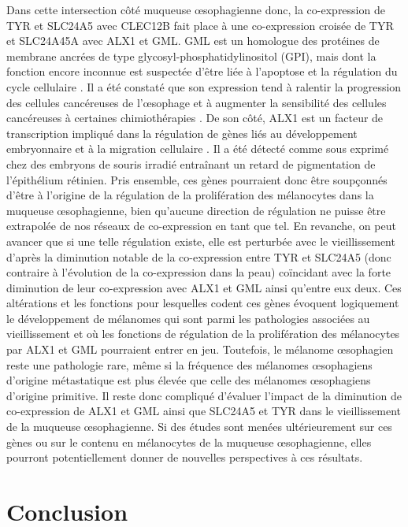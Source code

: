 Dans cette intersection côté muqueuse œsophagienne donc, la co-expression de TYR et SLC24A5 avec CLEC12B fait place à une co-expression croisée de TYR et SLC24A45A avec ALX1 et GML. 
GML est un homologue des protéines de membrane ancrées de type glycosyl-phosphatidylinositol (GPI), mais dont la fonction encore inconnue est suspectée d'être liée à l'apoptose et la régulation du cycle cellulaire . Il a été constaté que son expression tend à ralentir la progression des cellules cancéreuses de l'œsophage et à augmenter la sensibilité des cellules cancéreuses à certaines chimiothérapies . 
De son côté, ALX1 est un facteur de transcription impliqué dans la régulation de gènes liés au développement embryonnaire et à la migration cellulaire . Il a été détecté comme sous exprimé chez des embryons de souris irradié entraînant un retard de pigmentation de l'épithélium rétinien. 
Pris ensemble, ces gènes pourraient donc être soupçonnés d'être à l'origine de la régulation de la prolifération des mélanocytes dans la muqueuse œsophagienne, bien qu'aucune direction de régulation ne puisse être extrapolée de nos réseaux de co-expression en tant que tel. En revanche, on peut avancer que si une telle régulation existe, elle est perturbée avec le vieillissement d'après la diminution notable de la co-expression entre TYR et SLC24A5 (donc contraire à l'évolution de la co-expression dans la peau) coïncidant avec la forte diminution de leur co-expression avec ALX1 et GML ainsi qu'entre eux deux. 
Ces altérations et les fonctions pour lesquelles codent ces gènes évoquent logiquement le développement de mélanomes qui sont parmi les pathologies associées au vieillissement et où les fonctions de régulation de la prolifération des mélanocytes par ALX1 et GML pourraient entrer en jeu. Toutefois, le mélanome œsophagien reste une pathologie rare, même si la fréquence des mélanomes œsophagiens d'origine métastatique est plus élevée que celle des mélanomes œsophagiens d'origine primitive. Il reste donc compliqué d'évaluer l'impact de la diminution de co-expression de ALX1 et GML ainsi que SLC24A5 et TYR dans le vieillissement de la muqueuse œsophagienne. Si des études sont menées ultérieurement sur ces gènes ou sur le contenu en mélanocytes de la muqueuse œsophagienne, elles pourront potentiellement donner de nouvelles perspectives à ces résultats.





\section{Conclusion}

